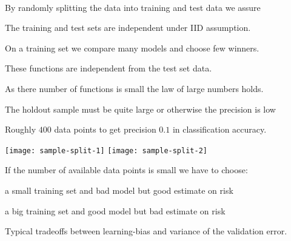 \documentclass[landscape,footrule]{foils}
\begin{document}


\

By randomly splitting the data into training and test data we assure
\begin{triangles}
\item The training and test sets are independent under IID assumption.
\item On a training set we compare many models and  choose few winners. 
\item These functions are independent from the test set data.
\item As there number of functions is small the law of large numbers holds. 
\end{triangles}




The holdout sample must be quite large or otherwise the precision is low
\begin{triangles}
\item Roughly $400$ data points to get precision $0.1$ in classification accuracy.
\end{triangles}






\begin{center}
\texttt{[image: sample-split-1]}\hspace*{1cm}
\texttt{[image: sample-split-2]}
\end{center}
\vspace{-1cm}

If the number of available data points is small we have to choose:
\begin{triangles}
\item a small training set and bad model but good estimate on risk
\item a big training set and good model but bad estimate on risk
\end{triangles}


\vspace*{-.5cm}
Typical tradeoffs between learning-bias and variance of the validation error.   
\end{document}
